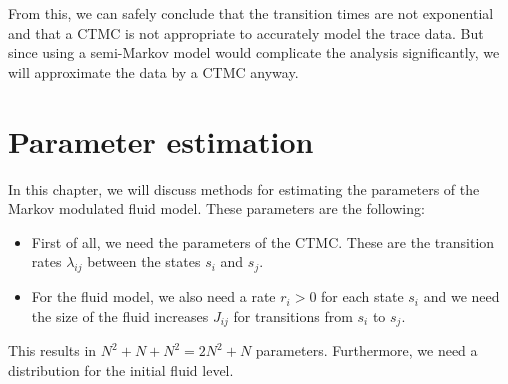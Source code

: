 \documentclass[a4paper]{thesis}
\theoremstyle{definition}
\begin{document}
\begin{figure}[H]
	\end{figure}
	From this, we can safely conclude that the transition times are not exponential and that a CTMC is not appropriate to accurately model the trace data.
	But since using a semi-Markov model would complicate the analysis significantly, we will approximate the data by a CTMC anyway.  
	\chapter{Parameter estimation}\label{chapter:ParameterEstimation}
	In this chapter, we will discuss methods for estimating the parameters of the Markov modulated fluid model.
	These parameters are the following:
	\begin{itemize}
		\item First of all, we need the parameters of the CTMC.
		These are the transition rates $\lambda_{ij}$ between the states $s_i$ and $s_j$.
		\item For the fluid model, we also need a rate $r_i>0$ for each state $s_i$ and we need the size of the fluid increases $J_{ij}$ for transitions from $s_i$ to $s_j$. 
	\end{itemize}
	This results in $N^2+N+N^2=2N^2+N$ parameters.
	Furthermore, we need a distribution for the initial fluid level.
\end{document}
